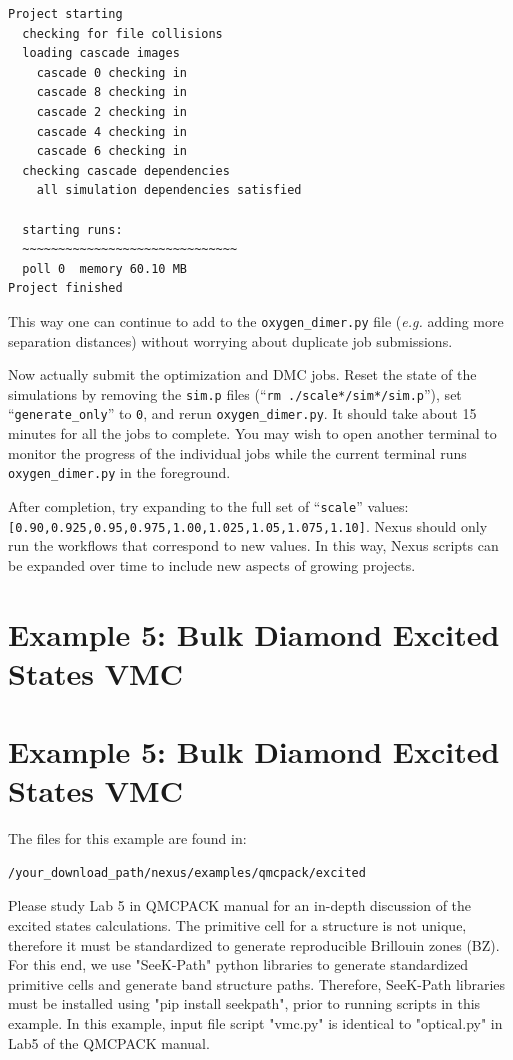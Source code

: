 \documentclass[oneside,11pt]{memoir}
\numberwithin{equation}{section}
\begin{document}
\begin{shaded}
\begin{verbatim}
Project starting 
  checking for file collisions 
  loading cascade images 
    cascade 0 checking in 
    cascade 8 checking in 
    cascade 2 checking in 
    cascade 4 checking in 
    cascade 6 checking in 
  checking cascade dependencies 
    all simulation dependencies satisfied 
  
  starting runs:
  ~~~~~~~~~~~~~~~~~~~~~~~~~~~~~~ 
  poll 0  memory 60.10 MB 
Project finished
\end{verbatim}
\end{shaded}
\noindent
This way one can continue to add to the \texttt{oxygen\_dimer.py} file (\emph{e.g.} adding more separation distances) without worrying about duplicate job submissions.

Now actually submit the optimization and DMC jobs.  Reset the state of the simulations by removing the \texttt{sim.p} files (``\texttt{rm ./scale*/sim*/sim.p}''), set ``\texttt{generate\_only}'' to \texttt{0}, and rerun \texttt{oxygen\_dimer.py}.  It should take about 15 minutes for all the jobs to complete.  You may wish to open another terminal to monitor the progress of the individual jobs while the current terminal runs \texttt{oxygen\_dimer.py} in the foreground.  

After completion, try expanding to the full set of ``\texttt{scale}'' values:\newline \texttt{[0.90,0.925,0.95,0.975,1.00,1.025,1.05,1.075,1.10]}.  Nexus should only run the workflows that correspond to new values.  In this way, Nexus scripts can be expanded over time to include new aspects of growing projects. 


\section{Example 5: Bulk Diamond Excited States VMC}\label{excited}
\section{Example 5: Bulk Diamond Excited States VMC}\label{excited}
The files for this example are found in:
\begin{shaded}
\begin{verbatim}
/your_download_path/nexus/examples/qmcpack/excited
\end{verbatim}
\end{shaded}

Please study Lab 5 in QMCPACK manual for an in-depth discussion of the excited states calculations. The primitive cell for a structure is not unique, therefore it must be standardized to generate reproducible Brillouin zones (BZ). For this end, we use "SeeK-Path" python libraries to generate standardized primitive cells and generate band structure paths. Therefore, SeeK-Path libraries must be installed using "pip install seekpath", prior to running scripts in this example. 
In this example, input file script "vmc.py" is identical to "optical.py" in Lab5 of the QMCPACK manual. 
\end{document}
